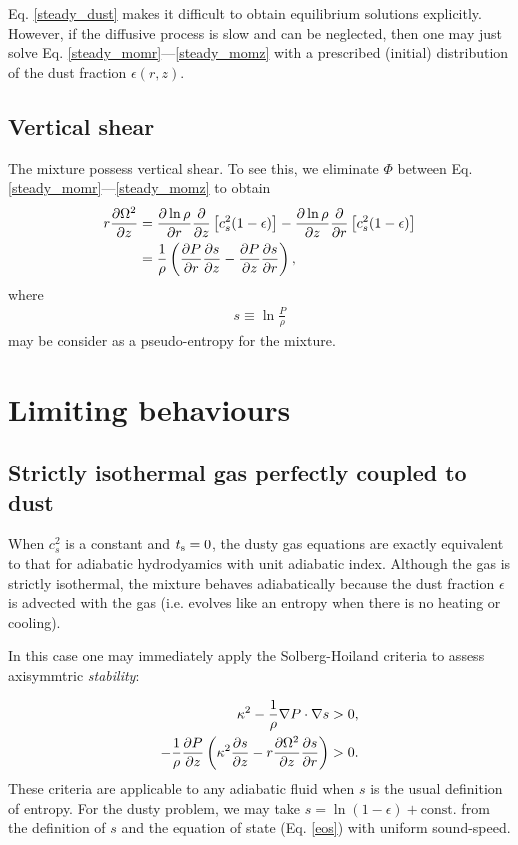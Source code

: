 Eq. \ref{steady_dust} makes it difficult to obtain equilibrium
solutions explicitly. However, if the diffusive process is slow and
can be neglected, then one may just solve
Eq. \ref{steady_momr}---\ref{steady_momz} with a prescribed (initial)
distribution of the dust fraction $\epsilon(r,z)$. 

\subsection{Vertical shear}
The mixture possess vertical shear. To see this, we eliminate $\Phi$
between Eq. \ref{steady_momr}---\ref{steady_momz} to 
obtain 
\begin{align}\label{vshear}
  r\frac{\partial \Omega^2}{\partial z} &= \frac{\partial\ln{\rho}}{\partial r}\frac{\partial}{\partial
    z}\left[c_s^2(1-\epsilon)\right] - \frac{\partial\ln{\rho}}{\partial z}
  \frac{\partial}{\partial r} \left[c_s^2(1-\epsilon)\right]\\  
  & = \frac{1}{\rho}\left(\frac{\partial P}{\partial r}\frac{\partial s}{\partial z} -\frac{\partial
    P}{\partial z}\frac{\partial s}{\partial r} \right),\notag
\end{align}
where
\begin{align}
   s \equiv \ln \frac{P}{\rho}
\end{align}
may be consider as a pseudo-entropy for the mixture. 

\section{Limiting behaviours}

\subsection{Strictly isothermal gas perfectly coupled to dust}  
When $c_s^2$ is a constant and $t_\mathrm{s}=0$, the dusty gas equations are
exactly equivalent to that for adiabatic hydrodyamics with unit adiabatic
index. Although the gas is strictly isothermal, the mixture behaves 
adiabatically because the dust fraction $\epsilon$ is advected with
the gas (i.e. evolves like an entropy when there is no heating or
cooling). 

In this case one may immediately apply the Solberg-Hoiland
criteria to assess axisymmtric \emph{stability}:  

\begin{align}
  \kappa^2 - \frac{1}{\rho}\nabla P \cdot \nabla s &> 0,\\
  -\frac{1}{\rho}\frac{\partial P}{\partial z} \left(\kappa^2 \frac{\partial s}{\partial z} -
  r\frac{\partial\Omega^2}{\partial z}\frac{\partial s}{\partial r}\right) &>0. 
\end{align}  
These criteria are applicable to any adiabatic fluid when $s$
is the usual definition of entropy. For the dusty problem, we may take 
$s=\ln{(1-\epsilon)}+\mathrm{const.}$ from the definition of $s$ and  
the equation of state (Eq. \ref{eos}) with uniform sound-speed. 

